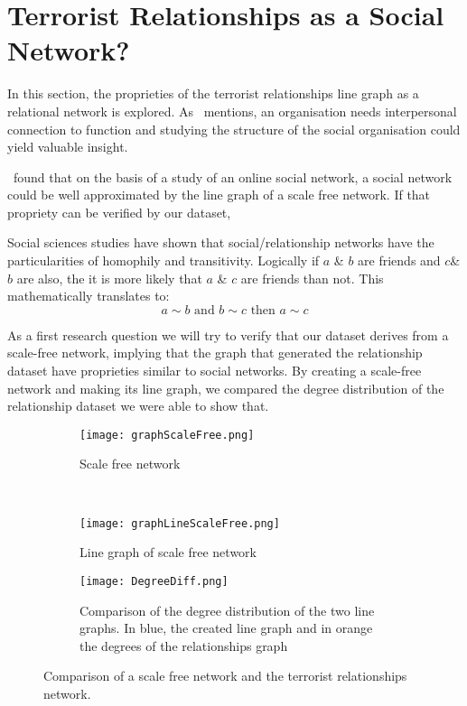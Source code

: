 \section{Terrorist Relationships as a Social Network?}
\label{sec:Terrorist Relationships as a Social Network?}
In this section, the proprieties of the terrorist relationships line graph as a relational network is explored. As~\cite{ZSG2006} mentions, an organisation needs interpersonal connection to function and studying the structure of the social organisation could yield valuable insight.

\cite{krawczyk_line_2011}~found that on the basis of a study of an online social network, a social network could be well approximated by the line graph of a scale free network. If that propriety can be verified by our dataset, %

Social sciences studies have shown that social/relationship networks have the particularities of homophily and transitivity.
Logically if $a$ \& $b$ are friends and $c$\& $b$ are also, the it is more likely that $a$ \& $c$ are friends than not. This mathematically translates to:
\begin{equation}
	a \sim b \text{ and } b \sim c \text{ then } a \sim c
\end{equation}

As a first research question we will try to verify that our dataset derives from a scale-free network, implying that the graph that generated the relationship dataset have proprieties similar to social networks.
By creating a scale-free network and making its line graph, we compared the degree distribution of the relationship dataset we were able to show that.

\begin{figure}[H]
\begin{center}
    \begin{subfigure}[b]{0.45\textwidth}
        \texttt{[image: graphScaleFree.png]}
        \caption{Scale free network}
        \label{fig:Scalefree}
    \end{subfigure}
    ~
    \begin{subfigure}[b]{0.45\textwidth}
        \texttt{[image: graphLineScaleFree.png]}
        \caption{Line graph of scale free network}
        \label{fig:lineG}
    \end{subfigure}
    
    \begin{subfigure}[b]{\textwidth}
    	\begin{centering}
        \texttt{[image: DegreeDiff.png]}
        \caption{\centering Comparison of the degree distribution of the two line graphs. In blue, the created line graph and in orange the degrees of the relationships graph}
        \label{fig:DegDiff}
        \end{centering}
    \end{subfigure}
\caption{Comparison of a scale free network and the terrorist relationships network.}
\label{fig:RelationshipScaleFree}
\end{center}
\end{figure}


